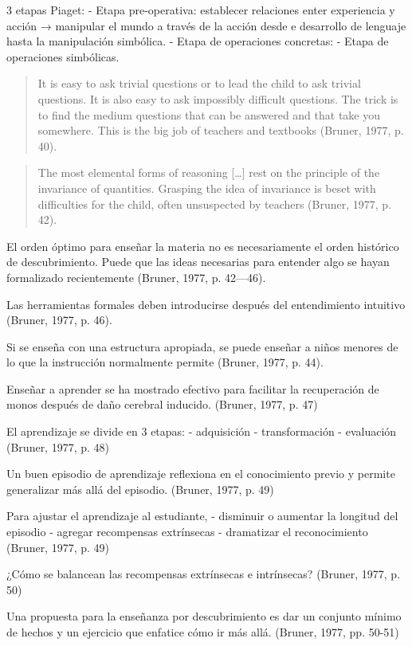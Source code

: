 \documentclass[
  12,
]{scrartcl}
\begin{document}
3 etapas Piaget: - Etapa pre-operativa: establecer relaciones enter
experiencia y acción → manipular el mundo a través de la acción desde e
desarrollo de lenguaje hasta la manipulación simbólica. - Etapa de
operaciones concretas: - Etapa de operaciones simbólicas.

\begin{quote}
It is easy to ask trivial questions or to lead the child to ask trivial
questions. It is also easy to ask impossibly difficult questions. The
trick is to find the medium questions that can be answered and that take
you somewhere. This is the big job of teachers and textbooks (Bruner,
1977, p. 40).
\end{quote}

\begin{quote}
The most elemental forms of reasoning {[}\ldots{]} rest on the principle
of the invariance of quantities. Grasping the idea of invariance is
beset with difficulties for the child, often unsuspected by teachers
(Bruner, 1977, p. 42).
\end{quote}

El orden óptimo para enseñar la materia no es necesariamente el orden
histórico de descubrimiento. Puede que las ideas necesarias para
entender algo se hayan formalizado recientemente (Bruner, 1977, p.
42---46).

Las herramientas formales deben introducirse después del entendimiento
intuitivo (Bruner, 1977, p. 46).

Si se enseña con una estructura apropiada, se puede enseñar a niños
menores de lo que la instrucción normalmente permite (Bruner, 1977, p.
44).

Enseñar a aprender se ha mostrado efectivo para facilitar la
recuperación de monos después de daño cerebral inducido. (Bruner, 1977,
p. 47)

El aprendizaje se divide en 3 etapas: - adquisición - transformación -
evaluación (Bruner, 1977, p. 48)

Un buen episodio de aprendizaje reflexiona en el conocimiento previo y
permite generalizar más allá del episodio. (Bruner, 1977, p. 49)

Para ajustar el aprendizaje al estudiante, - disminuir o aumentar la
longitud del episodio - agregar recompensas extrínsecas - dramatizar el
reconocimiento (Bruner, 1977, p. 49)

¿Cómo se balancean las recompensas extrínsecas e intrínsecas? (Bruner,
1977, p. 50)

Una propuesta para la enseñanza por descubrimiento es dar un conjunto
mínimo de hechos y un ejercicio que enfatice cómo ir más allá. (Bruner,
1977, pp. 50-51)
\end{document}
